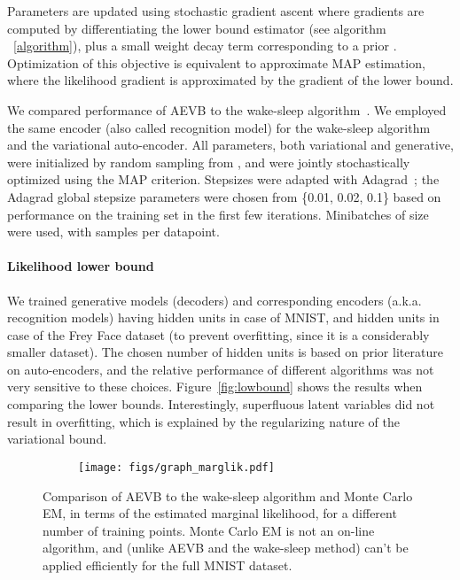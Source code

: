 \documentclass{article} \usepackage{nips13submit_e,times}
\theoremstyle{definition}
\theoremstyle{definition}
\begin{document}
Parameters are updated using stochastic gradient ascent where gradients are computed by differentiating the lower bound estimator  (see algorithm ~\ref{algorithm}), plus a small weight decay term corresponding to a prior .  Optimization of this objective is equivalent to approximate MAP estimation, where the likelihood gradient is approximated by the gradient of the lower bound.

We compared performance of AEVB to the wake-sleep algorithm~\cite{hinton1995wake}.  We employed the same encoder (also called recognition model) for the wake-sleep algorithm and the variational auto-encoder. All parameters, both variational and generative, were initialized by random sampling from , and were jointly stochastically optimized using the MAP criterion. Stepsizes were adapted with Adagrad~\cite{duchi2010adaptive}; the Adagrad global stepsize parameters were chosen from \{0.01, 0.02, 0.1\} based on performance on the training set in the first few iterations. Minibatches of size  were used, with  samples per datapoint.

\paragraph{Likelihood lower bound} 
We trained generative models (decoders) and corresponding encoders (a.k.a. recognition models) having  hidden units in case of MNIST, and  hidden units in case of the Frey Face dataset (to prevent overfitting, since it is a considerably smaller dataset). The chosen number of hidden units is based on prior literature on auto-encoders, and the relative performance of different algorithms was not very sensitive to these choices. Figure~\ref{fig:lowbound} shows the results when comparing the lower bounds. Interestingly, superfluous latent variables did not result in overfitting, which is explained by the regularizing nature of the variational bound.

\begin{figure}[t]
\begin{subfigure}[t]{1\textwidth}
\texttt{[image: figs/graph\_marglik.pdf]}
\end{subfigure}
\caption{Comparison of AEVB to the wake-sleep algorithm and Monte Carlo EM, in terms of the estimated marginal likelihood, for a different number of training points. Monte Carlo EM is not an on-line algorithm, and (unlike AEVB and the wake-sleep method) can't be applied efficiently for the full MNIST dataset.
}\label{fig:marglik}
\end{figure}
\end{document}
